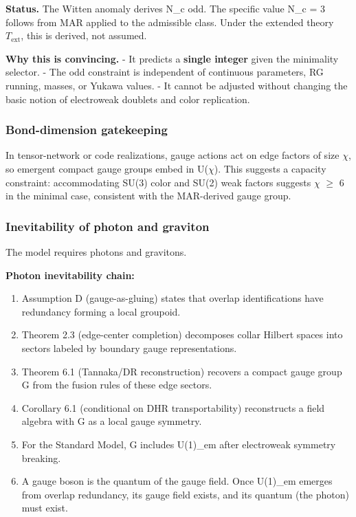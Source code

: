 \documentclass[11pt,a4paper]{article}
\theoremstyle{remark}
\providecommand{\tightlist}{%
  \setlength{\itemsep}{0pt}\setlength{\parskip}{0pt}}
\begin{document}
\textbf{Status.} The Witten anomaly derives N\_c odd. The specific value N\_c = 3
follows from MAR applied to the admissible class. Under the extended theory
\(T_{\mathrm{ext}}\), this is derived, not assumed.

\textbf{Why this is convincing.}
- It predicts a \textbf{single integer} given the minimality selector.
- The odd constraint is independent of continuous parameters, RG running,
masses, or Yukawa values.
- It cannot be adjusted without changing the basic notion of electroweak
doublets and color replication.

\subsubsection{Bond-dimension gatekeeping}\label{bond-dimension-gatekeeping}

In tensor-network or code realizations, gauge actions act on edge factors of
size \ensuremath{\chi}, so emergent compact gauge groups embed in U(\ensuremath{\chi}). This suggests a
capacity constraint: accommodating SU(3) color and SU(2) weak factors suggests
\ensuremath{\chi} \ensuremath{\geq} 6 in the minimal case, consistent with the MAR-derived gauge group.

\subsubsection{Inevitability of photon and graviton}\label{inevitability-of-photon-and-graviton}

The model requires photons and gravitons.

\textbf{Photon inevitability chain:}

\begin{enumerate}
\def\labelenumi{\arabic{enumi}.}
\tightlist
\item
  Assumption D (gauge-as-gluing) states that overlap identifications have
  redundancy forming a local groupoid.
\item
  Theorem 2.3 (edge-center completion) decomposes collar Hilbert spaces into
  sectors labeled by boundary gauge representations.
\item
  Theorem 6.1 (Tannaka/DR reconstruction) recovers a compact gauge group G
  from the fusion rules of these edge sectors.
\item
  Corollary 6.1 (conditional on DHR transportability) reconstructs a field
  algebra with G as a local gauge symmetry.
\item
  For the Standard Model, G includes U(1)\_em after electroweak symmetry
  breaking.
\item
  A gauge boson is the quantum of the gauge field. Once U(1)\_em emerges from
  overlap redundancy, its gauge field exists, and its quantum (the photon) must
  exist.
\end{enumerate}
\end{document}
